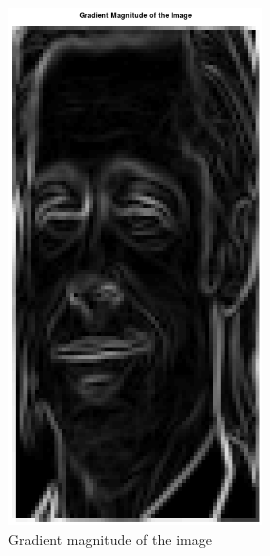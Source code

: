 \documentclass[a4paper]{article}
\begin{document}
\begin{minipage}{0.49\textwidth}
\begin{figure}[H]
    \centering
    \includegraphics[width=0.6\textwidth]{./images/2_1_gradient_magnitude.png}
    \caption{Gradient magnitude of the image}
\end{figure}
\end{minipage}
\end{document}
